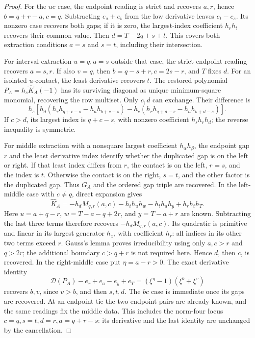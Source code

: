 \documentclass[11pt,a4paper]{amsart}
\numberwithin{equation}{section}
\theoremstyle{plain}
\theoremstyle{definition}
\begin{document}
\begin{proof}
For the \(uc\) case, the endpoint reading is strict and recovers
\(a,r\), hence \(b=q+r-a,c=q\).  Subtracting \(e_a+e_b\) from
the low derivative leaves \(e_t-e_s\).  Its nonzero case recovers both
gaps; if it is zero, the largest-index coefficient \(h_rh_t\) recovers
their common value.  Then \(d=T-2q+s+t\).  This covers both extraction
conditions \(a=s\) and \(s=t\), including their intersection.

For interval extraction \(u=q,a=s\) outside that case, the strict
endpoint reading recovers \(a=s,r\).  If also \(v=q\), then
\(b=q-s+r,c=2s-r\), and \(T\) fixes \(d\).
For an isolated \(u\)-contact, the least derivative recovers \(t\).
The restored polynomial \(P_A=h_s\widehat K_A(-1)\) has its surviving
diagonal as unique minimum-square monomial, recovering the row multiset.
Only \(c,d\) can exchange.  Their difference is
\[
 h_s\left[
 h_d(h_rh_{q+c-s}-h_ah_{b+c-s})
 -h_c(h_rh_{q+d-s}-h_ah_{b+d-s})\right].
\]
If \(c>d\), its largest index is \(q+c-s\), with nonzero
coefficient \(h_sh_rh_d\); the reverse inequality is symmetric.

For middle extraction with a nonsquare largest coefficient
\(h_\alpha h_\beta\), the endpoint gap \(r\) and the least derivative
index identify whether the duplicated gap is on the left or right.
If that least index differs from \(r\), the contact is on the left,
\(r=s\), and the index is \(t\).  Otherwise the contact is on the
right, \(s=t\), and the other factor is the duplicated gap.  Thus
\(G_A\) and the ordered gap triple are recovered.  In the left-middle
case with \(c\ne q\), direct expansion gives
\[
 \widehat K_A=-h_dM_{q,r}(a,c)
 -h_th_uh_w-h_th_ah_y+h_rh_th_T.
\]
Here \(u=a+q-r\), \(w=T-a-q+2r\), and \(y=T-a+r\)
are known.  Subtracting the last three terms therefore recovers
\(-h_dM_{q,r}(a,c)\).  Its quadratic is primitive and linear in its
largest generator \(h_x\), with coefficient \(h_r\): all indices in
its other two terms exceed \(r\).  Gauss's lemma proves irreducibility
using only \(a,c>r\) and \(q>2r\); the additional boundary
\(c>q+r\) is not required here.  Hence \(d\), then \(c\), is
recovered.  In the right-middle case put
\(\eta=a-r>0\).  The exact derivative identity
\[
 \mathcal D(P_A)-e_r+e_a-e_y+e_T
 =(\xi^\eta-1)(\xi^b+\xi^v)
\]
recovers \(b,v\), since \(v>b\), and then \(s,t,d\).
The \(bc\) case is immediate once its gaps are recovered.
At an endpoint tie the two endpoint pairs are already known, and the
same readings fix the middle data.  This includes the norm-four locus
\(c=q,s=t,d=r,a=q+r-s\): its derivative and the last identity are
unchanged by the cancellation.


\end{proof}
\end{document}
